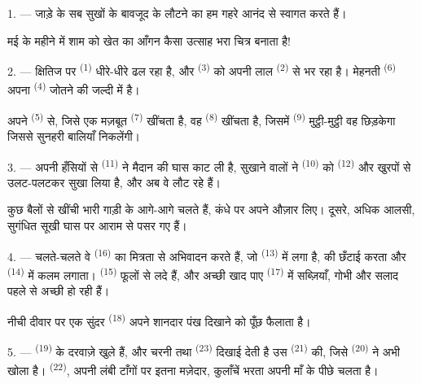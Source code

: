 \VUsaut{4.0mm}

1. --- जाड़े के सब सुखों के बावजूद  के लौटने का हम गहरे आनंद से
स्वागत करते हैं।

मई के महीने में शाम को खेत का आँगन कैसा उत्साह भरा चित्र बनाता है!

2. --- क्षितिज पर  \textsuperscript{(1)} धीरे-धीरे ढल रहा है, और
 \textsuperscript{(3)} को अपनी लाल  \textsuperscript{(2)}
से भर रहा है। मेहनती  \textsuperscript{(6)} अपना 
\textsuperscript{(4)} जोतने की जल्दी में है।

अपने  \textsuperscript{(5)} से, जिसे एक मज़बूत 
\textsuperscript{(7)} खींचता है, वह  \textsuperscript{(8)} खींचता
है, जिसमें
 \textsuperscript{(9)} मुट्ठी-मुट्ठी वह  छिड़केगा
जिससे सुनहरी बालियाँ निकलेंगी।

3. --- अपनी हँसियों से  \textsuperscript{(11)} ने मैदान की
घास काट ली है, सुखाने वालों ने  \textsuperscript{(10)} को
 \textsuperscript{(12)} और खुरपों से उलट-पलटकर सुखा लिया है, और अब
वे लौट रहे हैं।

कुछ बैलों से खींची भारी गाड़ी के आगे-आगे चलते हैं, कंधे पर अपने औज़ार लिए।
दूसरे, अधिक आलसी, सुगंधित सूखी घास पर आराम से पसर गए हैं।

4. --- चलते-चलते वे  \textsuperscript{(16)} का मित्रता से अभिवादन
करते हैं, जो  \textsuperscript{(13)} में लगा है,  की छँटाई करता और  \textsuperscript{(14)} में
कलम लगाता।  \textsuperscript{(15)} फूलों से लदे हैं, और
अच्छी खाद पाए  \textsuperscript{(17)} में सब्ज़ियाँ,
गोभी और सलाद पहले से अच्छी हो रही हैं।

नीची दीवार पर एक सुंदर  \textsuperscript{(18)} अपने शानदार पंख दिखाने
को पूँछ फैलाता है।

\VUsaut{3.0mm}

5. ---  \textsuperscript{(19)} के दरवाज़े खुले हैं, और चरनी तथा
 \textsuperscript{(23)} दिखाई देती है उस 
\textsuperscript{(21)} की, जिसे  \textsuperscript{(20)} ने अभी
खोला है।  \textsuperscript{(22)}, अपनी लंबी टाँगों पर इतना
मज़ेदार, कुलाँचें भरता अपनी माँ के पीछे चलता है।

